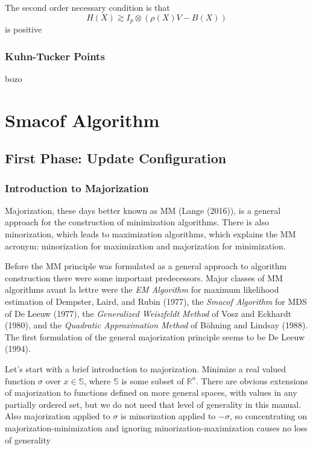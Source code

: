 \documentclass[
  12pt,
]{article}
\begin{document}
The second order necessary condition is that \[
H(X)\gtrsim I_p\otimes (\rho(X)V - B(X))
\] is positive

\subsubsection{Kuhn-Tucker Points}\label{kuhn-tucker-points}

bozo

\section{Smacof Algorithm}\label{smacof-algorithm}

\subsection{First Phase: Update Configuration}\label{first-phase-update-configuration}

\subsubsection{Introduction to Majorization}\label{introduction-to-majorization}

Majorization, these days better known as MM (Lange (2016)), is a general
approach for the construction of minimization algorithms. There is also
minorization, which leads to maximization algorithms, which explains the
MM acronym: minorization for maximization and majorization for
minimization.

Before the MM principle was formulated as a general approach to
algorithm construction there were some important predecessors. Major
classes of MM algorithms avant la lettre were the \emph{EM Algorithm} for
maximum likelihood estimation of Dempster, Laird, and Rubin (1977), the \emph{Smacof
Algorithm} for MDS of De Leeuw (1977), the \emph{Generalized Weiszfeldt Method}
of Vosz and Eckhardt (1980), and the \emph{Quadratic Approximation Method} of
Böhning and Lindsay (1988). The first formulation of the general majorization
principle seems to be De Leeuw (1994).

Let's start with a brief introduction to majorization. Minimize a real
valued function \(\sigma\) over \(x\in\mathbb{S}\), where \(\mathbb{S}\) is
some subset of \(\mathbb{R}^n\). There are obvious extensions of
majorization to functions defined on more general spaces, with values in
any partially ordered set, but we do not need that level of generality
in this manual. Also majorization applied to \(\sigma\) is minorization
applied to \(-\sigma\), so concentrating on majorization-minimization and
ignoring minorization-maximization causes no loss of generality
\end{document}
